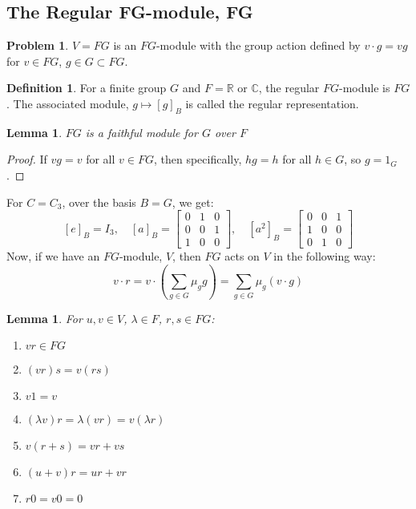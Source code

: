\documentclass[11pt, notitlepage]{article}
\numberwithin{equation}{section}
\theoremstyle{plain}
\newtheorem{lemma}[theorem]{Lemma}
\theoremstyle{definition}
\newtheorem{definition}[theorem]{Definition}
\newtheorem{problem}{Problem}
\newenvironment{example}
	{\pushQED{\qed}\renewcommand{\qedsymbol}{$\blacktriangleleft$}\examplex}
	{\popQED\endexamplex}
\newcommand{\R}{\mathbb{R}}
\newcommand{\C}{\mathbb{C}}
\begin{document}
\subsection{The Regular FG-module, FG}
\begin{problem}
	$V=FG$ is an $FG$-module with the group action defined by $v\cdot g=vg$ for $v\in FG$, $g\in G\subset FG$.
\end{problem}
\begin{definition}
	For a finite group $G$ and $F=\R$ or $\C$, the regular $FG$-module is $FG$. The associated module, $g\mapsto [g]_B$ is called the regular representation.
\end{definition}
\begin{lemma}
	$FG$ is a faithful module for $G$ over $F$
\end{lemma}
\begin{proof}
	If $vg=v$ for all $v\in FG$, then specifically, $hg=h$ for all $h\in G$, so $g=1_G$.
\end{proof}
\begin{example}
	For $C=C_3$, over the basis $B=G$, we get:
	\[[e]_B=I_3,\quad [a]_B = \begin{bmatrix}
	0&1&0\\0&0&1\\1&0&0
	\end{bmatrix},\quad[a^2]_B=\begin{bmatrix}
	0&0&1\\1&0&0\\0&1&0
	\end{bmatrix}\]
\end{example}
Now, if we have an $FG$-module, $V$, then $FG$ acts on $V$ in the following way:
\[v\cdot r = v\cdot \left(\sum_{g\in G}\mu_g g\right) = \sum_{g\in G}\mu_g(v\cdot g)\]
\begin{lemma}\label{Lem:FG}
	For $u,v\in V$, $\lambda\in F$, $r,s\in FG$:
	\begin{enumerate}[label=\emph{(\Roman*)}]
		\item $vr\in FG$
		\item $(vr)s = v(rs)$
		\item $v1=v$
		\item $(\lambda v)r=\lambda(vr)=v(\lambda r)$
		\item $v(r+s)=vr+vs$
		\item $(u+v)r=ur+vr$
		\item $r0=v0=0$
	\end{enumerate}
\end{lemma}
\end{document}
